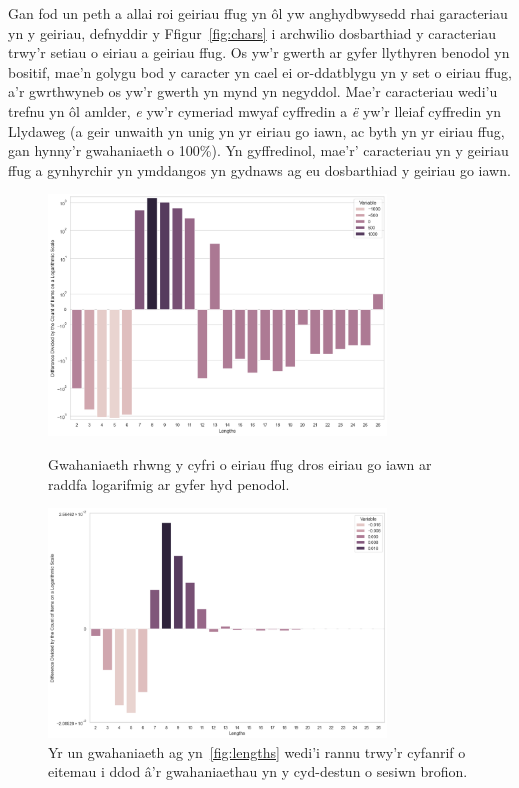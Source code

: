Gan fod un peth a allai roi geiriau ffug yn ôl yw anghydbwysedd rhai garacteriau yn y geiriau, defnyddir y Ffigur~\ref{fig:chars} i archwilio dosbarthiad y caracteriau trwy'r setiau o eiriau a geiriau ffug. Os yw'r gwerth ar gyfer llythyren benodol yn bositif, mae'n golygu bod y caracter yn cael ei or-ddatblygu yn y set o eiriau ffug, a'r gwrthwyneb os yw'r gwerth yn mynd yn negyddol. Mae'r caracteriau wedi'u trefnu yn ôl amlder, \textit{e} yw'r cymeriad mwyaf cyffredin a \textit{ë} yw'r lleiaf cyffredin yn Llydaweg (a geir unwaith yn unig yn yr eiriau go iawn, ac byth yn yr eiriau ffug, gan hynny'r gwahaniaeth o 100\%). Yn gyffredinol, mae'r' caracteriau yn y geiriau ffug a gynhyrchir yn ymddangos yn gydnaws ag eu dosbarthiad y geiriau go iawn.

\begin{figure}[htbp]
    \centering
    \begin{minipage}{0.45\textwidth}
        \centering
        \includegraphics[width=0.8\textwidth]{figures/lengths.png}
        \caption{Gwahaniaeth rhwng y cyfri o eiriau ffug dros eiriau go iawn ar raddfa logarifmig ar gyfer hyd penodol.}\label{fig:lengths}
    \end{minipage}
    \hfill
    \begin{minipage}{0.45\textwidth}
        \centering
        \includegraphics[width=0.8\textwidth]{figures/lengths_divided.png}
        \caption{Yr un gwahaniaeth ag yn~\ref{fig:lengths} wedi'i rannu trwy'r cyfanrif o eitemau i ddod â'r gwahaniaethau yn y cyd-destun o sesiwn brofion.}\label{fig:lengths_div}
    \end{minipage}
\end{figure}

